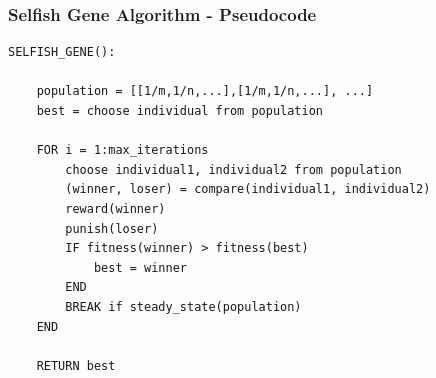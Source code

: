 
\begin{frame}[fragile]
	\frametitle{Selfish Gene Algorithm - Pseudocode}
	
\vspace{-0.8cm}
{\scriptsize
\begin{verbatim}
SELFISH_GENE():
    
    population = [[1/m,1/n,...],[1/m,1/n,...], ...]
    best = choose individual from population
    
    FOR i = 1:max_iterations
        choose individual1, individual2 from population
        (winner, loser) = compare(individual1, individual2)
        reward(winner)
        punish(loser)
        IF fitness(winner) > fitness(best)
            best = winner
        END
        BREAK if steady_state(population)
    END
    
    RETURN best
\end{verbatim}}

\end{frame}

